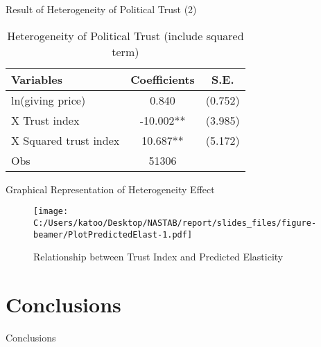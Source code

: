 \documentclass[
  ignorenonframetext,
]{beamer}
\begin{document}
\begin{frame}{Result of Heterogeneity of Political Trust (2)}
\protect\hypertarget{result-of-heterogeneity-of-political-trust-2}{}
\begin{table}

\caption{\label{tab:kableTabTrustHetero2Reg}Heterogeneity of Political Trust (include squared term)}
\centering
\begin{tabular}[t]{lcc}
\toprule
Variables & Coefficients & S.E.\\
\midrule
ln(giving price) & 0.840 & (0.752)\\
\hspace{1em}X Trust index & -10.002** & (3.985)\\
\hspace{1em}X Squared trust index & 10.687** & (5.172)\\
Obs & 51306 & \\
\bottomrule
\end{tabular}
\end{table}
\end{frame}

\begin{frame}{Graphical Representation of Heterogeneity Effect}
\protect\hypertarget{graphical-representation-of-heterogeneity-effect}{}
\begin{figure}
\centering
\texttt{[image: C:/Users/katoo/Desktop/NASTAB/report/slides\_files/figure-beamer/PlotPredictedElast-1.pdf]}
\caption{Relationship between Trust Index and Predicted Elasticity}
\end{figure}
\end{frame}

\hypertarget{conclusions}{%
\section{Conclusions}\label{conclusions}}

\begin{frame}{Conclusions}
\protect\hypertarget{conclusions-1}{}
\end{frame}
\end{document}
